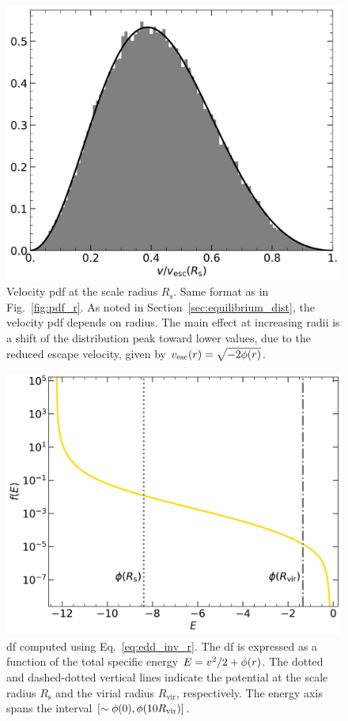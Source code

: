 \documentclass[twocolumn, a4paper]{article}
\begin{document}
\begin{figure}
    \centering
    \includegraphics[width=\columnwidth]{images/pdf_v.png}
    \caption{Velocity \acrshort{pdf} at the scale radius \(R_\text{s}\). Same format as in Fig.~\ref{fig:pdf_r}. As noted in Section~\ref{sec:equilibrium_dist}, the velocity \acrshort{pdf} depends on radius. The main effect at increasing radii is a shift of the distribution peak toward lower values, due to the reduced escape velocity, given by \(v_\text{esc}\qty(r) = \sqrt{-2 \phi\qty(r)}\).}
    \label{fig:pdf_v}
\end{figure}

\begin{figure}
    \centering
    \includegraphics[width=\columnwidth]{images/DF.png}
    \caption{\acrlong{df} computed using Eq.~\ref{eq:edd_inv_r}. The \acrshort{df} is expressed as a function of the total specific energy \(E = v^2/2 + \phi\qty(r)\). The dotted and dashed-dotted vertical lines indicate the potential at the scale radius \(R_\text{s}\) and the virial radius \(R_\text{vir}\), respectively. The energy axis spans the interval \(\qty[\sim \phi\qty(0), \phi\qty(10 R_\text{vir})]\).}
    \label{fig:df}
\end{figure}
\end{document}
